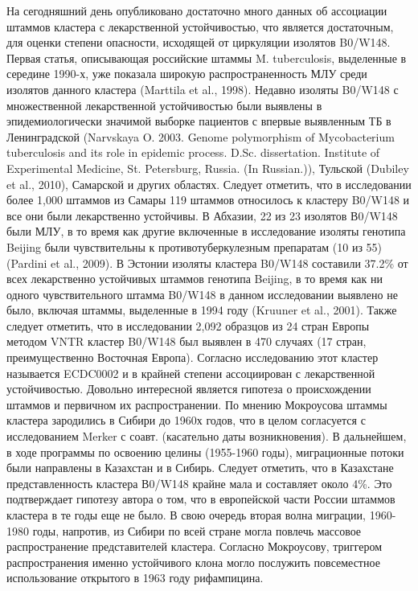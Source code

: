 На сегодняшний день опубликовано достаточно много данных об ассоциации штаммов кластера с лекарственной устойчивостью, что является достаточным, для оценки степени опасности, исходящей от циркуляции изолятов B0/W148. Первая статья, описывающая российские штаммы M. tuberculosis, выделенные в середине 1990-х, уже показала широкую распространенность МЛУ среди изолятов данного кластера (Marttila et al., 1998). Недавно изоляты B0/W148 с множественной лекарственной устойчивостью были выявлены в эпидемиологически значимой выборке пациентов с впервые выявленным ТБ в Ленинградской (Narvskaya O. 2003. Genome polymorphism of Mycobacterium tuberculosis and its role in epidemic process. D.Sc. dissertation. Institute of Experimental Medicine, St. Petersburg, Russia. (In Russian.)), Тульской (Dubiley et al., 2010), Самарской и других областях. Следует отметить, что в исследовании более 1,000 штаммов из Самары 119 штаммов относилось к кластеру B0/W148 и все они были лекарственно устойчивы. В Абхазии, 22 из 23 изолятов В0/W148 были МЛУ, в то время как другие включенные в исследование изоляты генотипа Beijing были чувствительны к противотуберкулезным препаратам (10 из 55) (Pardini et al., 2009). В Эстонии изоляты кластера B0/W148 составили 37.2\% от всех лекарственно устойчивых штаммов генотипа Beijing, в то время как ни одного чувствительного штамма B0/W148 в данном исследовании выявлено не было, включая штаммы, выделенные в 1994 году (Kruuner et al., 2001). Также следует отметить, что в исследовании 2,092 образцов из 24 стран Европы методом VNTR кластер B0/W148 был выявлен в 470 случаях (17 стран, преимущественно Восточная Европа). Согласно исследованию этот кластер называется ECDC0002 и в крайней степени ассоциирован с лекарственной устойчивостью.
Довольно интересной является гипотеза о происхождении штаммов и первичном их распространении. По мнению Мокроусова штаммы кластера зародились в Сибири до 1960х годов, что в целом согласуется с исследованием Merker с соавт. (касательно даты возникновения). В дальнейшем, в ходе программы по освоению целины (1955-1960 годы), миграционные потоки были направлены в Казахстан и в Сибирь. Следует отметить, что в Казахстане представленность кластера В0/W148 крайне мала и составляет около 4\%. Это подтверждает гипотезу автора о том, что в европейской части России штаммов кластера в те годы еще не было. В свою очередь вторая волна миграции, 1960-1980 годы, напротив, из Сибири по всей стране могла повлечь массовое распространение представителей кластера. Согласно Мокроусову, триггером распространения именно устойчивого клона могло послужить повсеместное использование открытого в 1963 году рифампицина.
 
